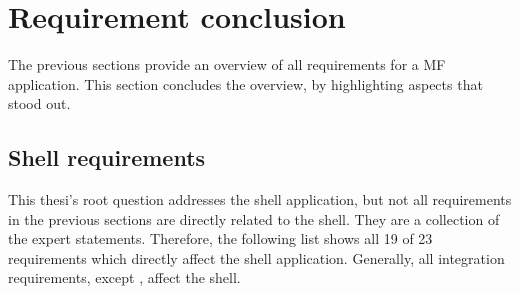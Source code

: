 
\section{Requirement conclusion}\label{cha:requirements_conclusion}

The previous sections provide an overview of all requirements for a \ac{MF} application.
This section concludes the overview, by highlighting aspects that stood out.





\subsection{Shell requirements}\label{cha:requirements_conclusion_shellrequirements}

This thesi's root question addresses the shell application, but not all requirements in the previous sections are directly related to the shell.
They are a collection of the expert statements.
Therefore, the following list shows all 19 of 23 requirements which directly affect the shell application.
Generally, all integration requirements, except \textit{}, affect the shell.

\pagebreak

